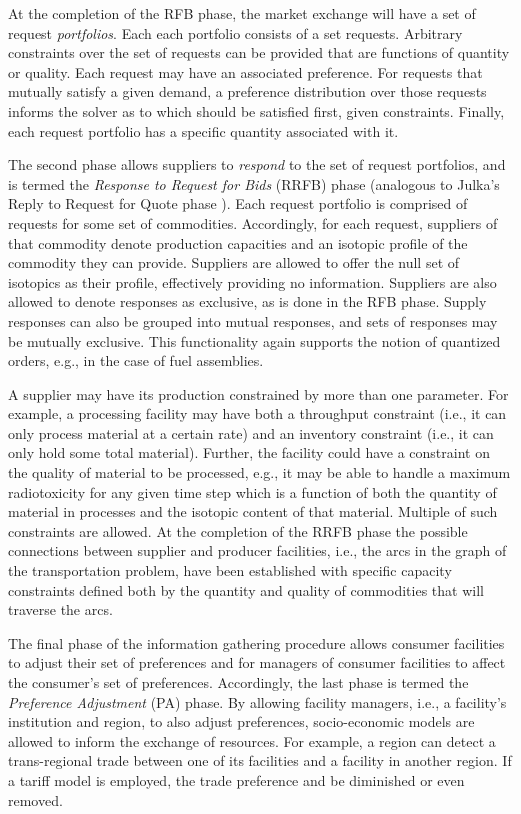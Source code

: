 At the completion of the RFB phase, the market exchange will have a set of
request \textit{portfolios}. Each each portfolio consists of a set
requests. Arbitrary constraints over the set of requests can be provided that
are functions of quantity or quality.  Each request may have an associated
preference. For requests that mutually satisfy a given demand, a preference
distribution over those requests informs the solver as to which should be
satisfied first, given constraints. Finally, each request portfolio has a
specific quantity associated with it.

The second phase allows suppliers to \textit{respond} to the set of request
portfolios, and is termed the \textit{Response to Request for Bids} (RRFB) phase
(analogous to Julka's Reply to Request for Quote phase
\cite{julka_agent-based_2002}). Each request portfolio is comprised of requests
for some set of commodities. Accordingly, for each request, suppliers of that
commodity denote production capacities and an isotopic profile of the commodity
they can provide. Suppliers are allowed to offer the null set of isotopics as
their profile, effectively providing no information. Suppliers are also allowed
to denote responses as exclusive, as is done in the RFB phase. Supply responses
can also be grouped into mutual responses, and sets of responses may be mutually
exclusive. This functionality again supports the notion of quantized orders,
e.g., in the case of fuel assemblies. 

A supplier may have its production constrained by more than one parameter. For
example, a processing facility may have both a throughput constraint (i.e., it
can only process material at a certain rate) and an inventory constraint (i.e.,
it can only hold some total material). Further, the facility could have a
constraint on the quality of material to be processed, e.g., it may be able to
handle a maximum radiotoxicity for any given time step which is a function of
both the quantity of material in processes and the isotopic content of that
material. Multiple of such constraints are allowed. At the completion of the
RRFB phase the possible connections between supplier and producer facilities,
i.e., the arcs in the graph of the transportation problem, have been established
with specific capacity constraints defined both by the quantity and quality of
commodities that will traverse the arcs.

The final phase of the information gathering procedure allows consumer
facilities to adjust their set of preferences and for managers of consumer
facilities to affect the consumer's set of preferences. Accordingly, the last
phase is termed the \textit{Preference Adjustment} (PA) phase. By allowing
facility managers, i.e., a facility's institution and region, to also adjust
preferences, socio-economic models are allowed to inform the exchange of
resources. For example, a region can detect a trans-regional trade between one of
its facilities and a facility in another region. If a tariff model is employed,
the trade preference and be diminished or even removed.

